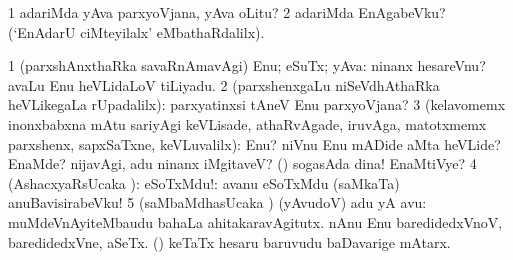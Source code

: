 \noindent 
\gl{\pagu}
\expl{}
\bmng
\bnum
\num{1}    adariMda yAva parxyoVjana, yAva oLitu? 
\num{2}  adariMda EnAgabeVku? (`EnAdarU ciMteyilalx' eMbathaRdalilx). 
\enum
\emng
\eentry

\bentry
{} 
\gl{\sanA}
\expl{}
\bmng
\bnum
\num{1} (parxshAnxthaRka savaRnAmavAgi) Enu; eSuTx; yAva:  ninanx hesareVnu?  avaLu Enu heVLidaLoV tiLiyadu. 
\num{2} (parxshenxgaLu niSeVdhAthaRka heVLikegaLa rUpadalilx):  parxyatinxsi tAneV Enu parxyoVjana? 
\num{3} (kelavomemx inonxbabxna mAtu sariyAgi keVLisade, athaRvAgade, iruvAga, matotxmemx parxshenx, sapxSaTxne, keVLuvalilx):  Enu? niVnu Enu mADide aMta heVLide?  EnaMde? nijavAgi, adu ninanx iMgitaveV? (\AmA)  sogasAda dina! EnaMtiVye? 
\num{4} (AshacxyaRsUcaka \sanA): eSoTxMdu!:  avanu eSoTxMdu (saMkaTa) anuBavisirabeVku! 
\hypertarget{what(2)5}{} 
\hypertarget{what2 pagu5}{} 
\num{5} (saMbaMdhasUcaka \sanA) (yAvudoV) adu yA avu:  muMdeVnAyiteMbaudu bahaLa ahitakaravAgitutx.  nAnu Enu baredidedxVnoV, baredidedxVne, aSeTx.  (\ashi) keTaTx hesaru baruvudu baDavarige mAtarx. 
\enum
\emng

